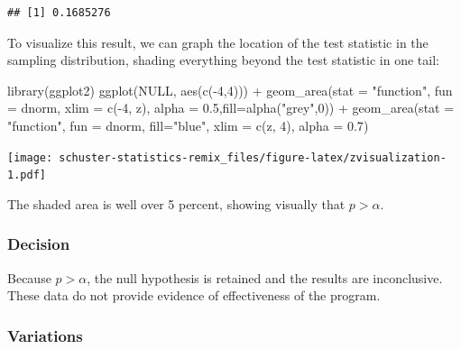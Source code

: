\documentclass[
]{book}
\newenvironment{Shaded}{\begin{snugshade}}{\end{snugshade}}
\newcommand{\AttributeTok}[1]{\textcolor[rgb]{0.77,0.63,0.00}{#1}}
\newcommand{\ConstantTok}[1]{\textcolor[rgb]{0.00,0.00,0.00}{#1}}
\newcommand{\DecValTok}[1]{\textcolor[rgb]{0.00,0.00,0.81}{#1}}
\newcommand{\FloatTok}[1]{\textcolor[rgb]{0.00,0.00,0.81}{#1}}
\newcommand{\FunctionTok}[1]{\textcolor[rgb]{0.00,0.00,0.00}{#1}}
\newcommand{\NormalTok}[1]{#1}
\newcommand{\SpecialCharTok}[1]{\textcolor[rgb]{0.00,0.00,0.00}{#1}}
\newcommand{\StringTok}[1]{\textcolor[rgb]{0.31,0.60,0.02}{#1}}
\begin{document}
\begin{verbatim}
## [1] 0.1685276
\end{verbatim}

To visualize this result, we can graph the location of the test statistic in the sampling distribution, shading everything beyond the test statistic in one tail:

\begin{Shaded}
\begin{Highlighting}[]
\FunctionTok{library}\NormalTok{(ggplot2)}
\FunctionTok{ggplot}\NormalTok{(}\ConstantTok{NULL}\NormalTok{, }\FunctionTok{aes}\NormalTok{(}\FunctionTok{c}\NormalTok{(}\SpecialCharTok{{-}}\DecValTok{4}\NormalTok{,}\DecValTok{4}\NormalTok{))) }\SpecialCharTok{+}
  \FunctionTok{geom\_area}\NormalTok{(}\AttributeTok{stat =} \StringTok{"function"}\NormalTok{, }\AttributeTok{fun =}\NormalTok{ dnorm, }\AttributeTok{xlim =} \FunctionTok{c}\NormalTok{(}\SpecialCharTok{{-}}\DecValTok{4}\NormalTok{, z), }\AttributeTok{alpha =} \FloatTok{0.5}\NormalTok{,}\AttributeTok{fill=}\FunctionTok{alpha}\NormalTok{(}\StringTok{"grey"}\NormalTok{,}\DecValTok{0}\NormalTok{)) }\SpecialCharTok{+}
  \FunctionTok{geom\_area}\NormalTok{(}\AttributeTok{stat =} \StringTok{"function"}\NormalTok{, }\AttributeTok{fun =}\NormalTok{ dnorm, }\AttributeTok{fill=}\StringTok{"blue"}\NormalTok{, }\AttributeTok{xlim =} \FunctionTok{c}\NormalTok{(z, }\DecValTok{4}\NormalTok{), }\AttributeTok{alpha =} \FloatTok{0.7}\NormalTok{)}
\end{Highlighting}
\end{Shaded}

\texttt{[image: schuster-statistics-remix\_files/figure-latex/zvisualization-1.pdf]}

The shaded area is well over 5 percent, showing visually that \(p>\alpha\).

\hypertarget{decision}{%
\subsubsection{Decision}\label{decision}}

Because \(p>{\alpha}\), the null hypothesis is retained and the results are inconclusive. These data do not provide evidence of effectiveness of the program.

\hypertarget{variations}{%
\subsubsection{Variations}\label{variations}}
\end{document}
